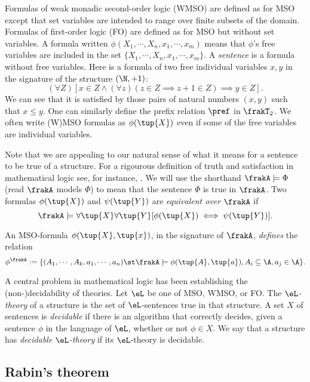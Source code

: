 Formulas of weak monadic second-order logic (WMSO) are defined as for MSO
except that set variables are intended to range over finite subsets of the
domain. Formulas of first-order logic (FO) are defined as for MSO but without 
set variables. A formula written $\phi(X_1,\cdots,X_n,x_1,\cdots,x_m)$ means that $\phi$'s
free variables are included in the set $\{X_1,\cdots,X_n,x_1,\cdots,x_m\}$.
A {\em sentence} is a formula without free variables. 
Here is a formula of two free individual variables $x,y$ in the signature of the structure $(\N,+1)$:
\[
(\forall Z) [x \in Z \wedge (\forall z)(z \in Z \implies z+1 \in Z) \implies y \in Z].
\]
We can see that it is satisfied by those pairs of natural numbers $(x,y)$ such that $x \leq y$. 
One can similarly define the prefix relation $\pref$ in $\frakT_2$. We often write (W)MSO formulas as $\phi(\tup{X})$ even if some of the free
variables are individual variables.

Note that we are appealing to our natural sense of what it means for a
sentence to be true of a structure. 
For a rigourous definition of truth and satisfaction in
mathematical logic see, for instance, \cite{Bool07}. We will use the shorthand $\frakA \models \Phi$
(read $\frakA$ models $\Phi$) to mean that the sentence $\Phi$ is true in
$\frakA$. Two formulas $\phi(\tup{X})$ and $\psi(\tup{Y})$ are {\em equivalent over $\frakA$}
if \[\frakA \models \forall \tup{X} \forall \tup{Y} [\phi(\tup{X}) \iff \psi(\tup{Y})].\]

An MSO-formula $\phi(\tup{X},\tup{x})$, in the signature of $\frakA$,
{\em defines} the relation 
\[
\phi^\frakA := \{(A_1,\cdots,A_k,a_1,\cdots,a_n) \st \frakA \models \phi(\tup{A},\tup{a}), A_i \subseteq \A, a_j \in \A \}.
\]

A central problem in mathematical logic has been establishing  the (non-)decidability
of theories.
Let $\eL$ be one of MSO, WMSO, or FO. The {\em $\eL$-theory} of a structure is the set
of $\eL$-sentences true in that structure.  A set $X$ of sentences is {\em
decidable} if there is an algorithm that correctly decides, given a sentence
$\phi$ in the language of $\eL$, whether or not $\phi \in X$.  We say that a
structure has {\em decidable $\eL$-theory} if its $\eL$-theory is decidable.  

\subsection{Rabin's theorem}

